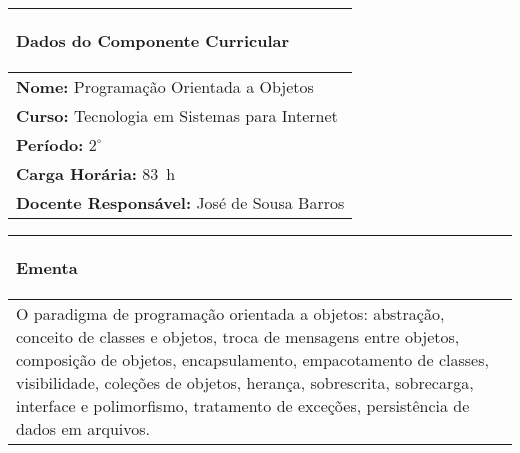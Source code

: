 
\begin{table}[h!]

\centering
\begin{small} 
\setlength{\tabcolsep}{3pt} 
\begin{tabular}{|p{15cm}|}\hline


\begin{center}\textbf{Dados do Componente Curricular}\end{center}\\ \hline

\textbf{Nome:} Programação Orientada a Objetos \\ \hline
\textbf{Curso:} Tecnologia em Sistemas para Internet \\ \hline
\textbf{Período:} $2^{\circ}$ \\ \hline
\textbf{Carga Horária:} 83~h \\ \hline
\textbf{Docente Responsável:} José de Sousa Barros \\ \hline


\end{tabular} 
\end{small}
\label{dadosinstituicao}
\end{table} 

\begin{table}[h!]
\centering
\begin{small} 
\setlength{\tabcolsep}{1pt} 
\begin{tabular}{|p{15cm}|}\hline

\begin{center}\textbf{Ementa}\end{center}\\ \hline
O paradigma de programação orientada a objetos: abstração, conceito de classes e objetos, troca de mensagens entre objetos, composição de objetos, encapsulamento, empacotamento de classes, visibilidade, coleções de objetos, herança, sobrescrita, sobrecarga, interface e polimorfismo, tratamento de exceções, persistência de dados em arquivos. \\ \hline

\end{tabular} 
\end{small}
\label{dadosinstituicao}
\end{table} 

